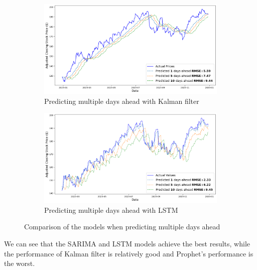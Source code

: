 \documentclass[12pt]{article}
\theoremstyle{definition}
\begin{document}
\begin{figure}[H]
  \begin{subfigure}[b]{0.49\textwidth}
      \centering
      \includegraphics[width=\textwidth]{Images/Kalman filters multiple days ahead.png}
      \caption{Predicting multiple days ahead with Kalman filter}
      \label{fig:image3}
  \end{subfigure}
  \hfill %
  \begin{subfigure}[b]{0.49\textwidth}
      \centering
      \includegraphics[width=\textwidth]{Images/LSTM multiple days ahead.png}
      \caption{Predicting multiple days ahead with LSTM}
      \label{fig:image4}
  \end{subfigure}
  
  \caption{Comparison of the models when predicting multiple days ahead}
  \end{figure}

We can see that the SARIMA and LSTM models achieve the best results,
while the performance of Kalman filter is relatively good and Prophet's performance is the worst.
\end{document}
